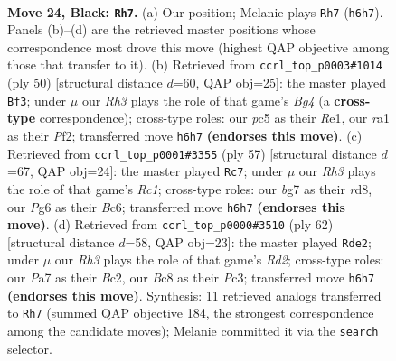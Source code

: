 \documentclass[11pt]{article}
\begin{document}
\clearpage

\begin{figure}[p]\centering
\begin{subfigure}{0.46\textwidth}\centering
\resizebox{\linewidth}{!}{%
\newchessgame
\chessboard[
  setfen={1rb1k3/p1p1bpB1/2p3pr/P1P4p/1P3P1P/8/7R/RN2K3 b Q - 4 24},
  showmover=false,
  pgfstyle=straightmove, color=movearrow, markmove={h6-h7}
]}
\caption{}
\end{subfigure}\hfill
\begin{subfigure}{0.46\textwidth}\centering
\resizebox{\linewidth}{!}{%
\newchessgame
\chessboard[
  setfen={4r1k1/3prp2/b1p3p1/2P1P2p/pR4B1/7P/PP3PP1/4R1K1 w - - 0 26},
  showmover=false,
  pgfstyle=straightmove, color=movearrow, markmove={g4-f3}
]}
\caption{}
\end{subfigure}
\\[4pt]
\begin{subfigure}{0.46\textwidth}\centering
\resizebox{\linewidth}{!}{%
\newchessgame
\chessboard[
  setfen={2rR4/1p3pk1/p1b3p1/P1p1r3/2B4p/1PP4P/3R1PP1/5K2 b - - 5 29},
  showmover=false,
  pgfstyle=straightmove, color=movearrow, markmove={c8-c7}
]}
\caption{}
\end{subfigure}\hfill
\begin{subfigure}{0.46\textwidth}\centering
\resizebox{\linewidth}{!}{%
\newchessgame
\chessboard[
  setfen={6r1/pbr1kp2/4p1pp/2p5/5PPP/1PP1R3/PKBR4/8 w - - 5 32},
  showmover=false,
  pgfstyle=straightmove, color=movearrow, markmove={d2-e2}
]}
\caption{}
\end{subfigure}
\caption{\textbf{Move 24, Black: \texttt{Rh7}.} (a) Our position; Melanie plays \texttt{Rh7} (\texttt{h6h7}). Panels (b)--(d) are the retrieved master positions whose correspondence most drove this move (highest QAP objective among those that transfer to it). (b) Retrieved from \texttt{ccrl\_top\_p0003\#1014} (ply 50) [structural distance $d$=60, QAP obj=25]: the master played \texttt{Bf3}; under $\mu$ our \emph{Rh3} plays the role of that game's \emph{Bg4} (a \textbf{cross-type} correspondence); cross-type roles: our \emph{p}c5 as their \emph{R}e1, our \emph{r}a1 as their \emph{P}f2; transferred move \texttt{h6h7} \textbf{(endorses this move)}. (c) Retrieved from \texttt{ccrl\_top\_p0001\#3355} (ply 57) [structural distance $d$=67, QAP obj=24]: the master played \texttt{Rc7}; under $\mu$ our \emph{Rh3} plays the role of that game's \emph{Rc1}; cross-type roles: our \emph{b}g7 as their \emph{r}d8, our \emph{P}g6 as their \emph{B}c6; transferred move \texttt{h6h7} \textbf{(endorses this move)}. (d) Retrieved from \texttt{ccrl\_top\_p0000\#3510} (ply 62) [structural distance $d$=58, QAP obj=23]: the master played \texttt{Rde2}; under $\mu$ our \emph{Rh3} plays the role of that game's \emph{Rd2}; cross-type roles: our \emph{P}a7 as their \emph{B}c2, our \emph{B}c8 as their \emph{P}c3; transferred move \texttt{h6h7} \textbf{(endorses this move)}. Synthesis: 11 retrieved analogs transferred to \texttt{Rh7} (summed QAP objective 184, the strongest correspondence among the candidate moves); Melanie committed it via the \texttt{search} selector.}
\label{fig:thought-m47}
\end{figure}
\end{document}
